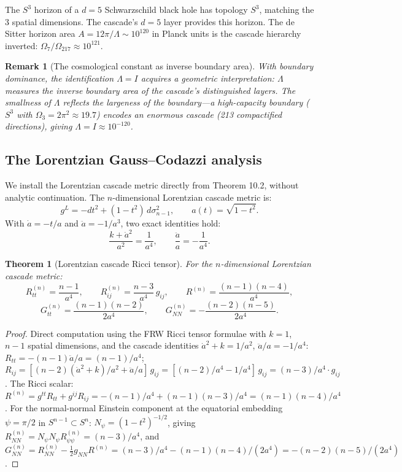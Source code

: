 \documentclass[12pt,a4paper]{article}
\newtheorem{theorem}{Theorem}[section]
\newtheorem*{remark}{Remark}
\begin{document}
The $S^3$ horizon of a $d = 5$ Schwarzschild black hole has topology $S^3$, matching the 3
spatial dimensions. The cascade's $d = 5$ layer provides this horizon. The de Sitter horizon
area $A = 12\pi/\Lambda \sim 10^{120}$ in Planck units is the cascade hierarchy inverted: $\Omega_7/\Omega_{217} \approx 10^{121}$.

\begin{remark}[The cosmological constant as inverse boundary area]
With boundary
dominance, the identification $\Lambda = I$ acquires a geometric interpretation: $\Lambda$ measures the
inverse boundary area of the cascade's distinguished layers. The smallness of $\Lambda$ reflects the
largeness of the boundary---a high-capacity boundary ($S^3$ with $\Omega_3 = 2\pi^2 \approx 19.7$) encodes
an enormous cascade (213 compactified directions), giving $\Lambda = I \approx 10^{-120}$.
\end{remark}

\subsection{The Lorentzian Gauss--Codazzi analysis}

We install the Lorentzian cascade metric directly from Theorem 10.2, without analytic
continuation. The $n$-dimensional Lorentzian cascade metric is:
\[
g^L = -dt^2 + (1 - t^2)\,d\sigma_{n-1}^2, \qquad a(t) = \sqrt{1 - t^2}.
\]
With $\dot{a} = -t/a$ and $\ddot{a} = -1/a^3$, two exact identities hold:
\[
\frac{k + \dot{a}^2}{a^2} = \frac{1}{a^4}, \qquad \frac{\ddot{a}}{a} = -\frac{1}{a^4}.
\]

\begin{theorem}[Lorentzian cascade Ricci tensor]
For the $n$-dimensional Lorentzian cascade metric:
\[
R^{(n)}_{tt} = \frac{n - 1}{a^4}, \qquad R^{(n)}_{ij} = \frac{n - 3}{a^4}\,g_{ij}, \qquad R^{(n)} = \frac{(n - 1)(n - 4)}{a^4},
\]
\[
G^{(n)}_{tt} = \frac{(n - 1)(n - 2)}{2a^4}, \qquad G^{(n)}_{NN} = -\frac{(n - 2)(n - 5)}{2a^4}.
\]
\end{theorem}

\begin{proof}
Direct computation using the FRW Ricci tensor formulae with $k = 1$, $n - 1$ spatial
dimensions, and the cascade identities $\dot{a}^2 + k = 1/a^2$, $\ddot{a}/a = -1/a^4$: $R_{tt} = -(n - 1)\ddot{a}/a =
(n - 1)/a^4$; $R_{ij} = [(n - 2)(\dot{a}^2 + k)/a^2 + \ddot{a}/a]\,g_{ij} = [(n - 2)/a^4 - 1/a^4]\,g_{ij} = (n - 3)/a^4 \cdot g_{ij}$. The
Ricci scalar: $R^{(n)} = g^{tt}R_{tt} + g^{ij}R_{ij} = -(n - 1)/a^4 + (n - 1)(n - 3)/a^4 = (n - 1)(n - 4)/a^4$.
For the normal-normal Einstein component at the equatorial embedding $\psi = \pi/2$ in
$S^{n-1} \subset S^n$: $N_\psi = (1 - t^2)^{-1/2}$, giving $R^{(n)}_{NN} = N_\psi N_\psi R^{(n)}_{\psi\psi} = (n - 3)/a^4$, and $G^{(n)}_{NN} =
R^{(n)}_{NN} - \tfrac{1}{2}g_{NN}R^{(n)} = (n - 3)/a^4 - (n - 1)(n - 4)/(2a^4) = -(n - 2)(n - 5)/(2a^4)$.
\end{proof}
\end{document}
